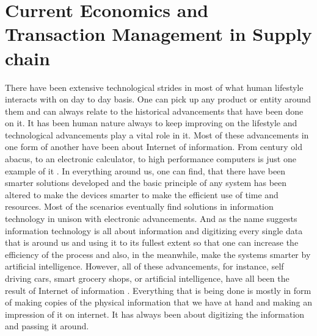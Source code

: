 \maketitle

\section{Current Economics and Transaction Management in Supply chain}

There have been extensive technological strides in most of what human lifestyle interacts with on day to day basis. One can pick up any product or entity around them and can always relate to the historical advancements that have been done on it. It has been human nature always to keep improving on the lifestyle and technological advancements play a vital role in it. Most of these advancements in one form of another have been about Internet of information. From century old abacus, to an electronic calculator, to high performance computers is just one example of it \cite{tapscott1}. In everything around us, one can find, that there have been smarter solutions developed and the basic principle of any system has been altered to make the devices smarter to make the efficient use of time and resources. Most of the scenarios eventually find solutions in information technology in unison with electronic advancements. And as the name suggests information technology is all about information and digitizing every single data that is around us and using it to its fullest extent so that one can increase the efficiency of the process and also, in the meanwhile, make the systems smarter by artificial intelligence. However, all of these advancements, for instance, self driving cars, smart grocery shops, or artificial intelligence, have all been the result of Internet of information \cite{tapscott1}. Everything that is being done is mostly in form of making copies of the physical information that we have at hand and making an impression of it on internet. It has always been about digitizing the information and passing it around.


